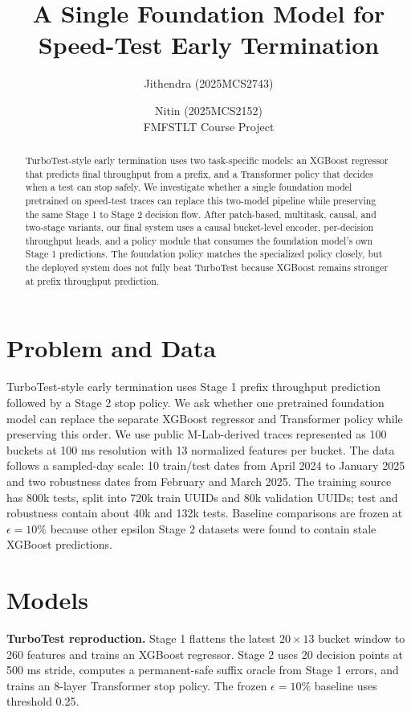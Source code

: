 \documentclass[10pt,twocolumn]{article}
\title{A Single Foundation Model for Speed-Test Early Termination}
\author{Jithendra (2025MCS2743) \and Nitin (2025MCS2152)\\
FMFSTLT Course Project}
\date{}
\newcommand{\eps}{\epsilon}
\begin{document}
\maketitle

\begin{abstract}
TurboTest-style early termination uses two task-specific models: an XGBoost regressor that predicts final throughput from a prefix, and a Transformer policy that decides when a test can stop safely. We investigate whether a single foundation model pretrained on speed-test traces can replace this two-model pipeline while preserving the same Stage 1 to Stage 2 decision flow. After patch-based, multitask, causal, and two-stage variants, our final system uses a causal bucket-level encoder, per-decision throughput heads, and a policy module that consumes the foundation model's own Stage 1 predictions. The foundation policy matches the specialized policy closely, but the deployed system does not fully beat TurboTest because XGBoost remains stronger at prefix throughput prediction.
\end{abstract}

\section{Problem and Data}
TurboTest-style early termination uses Stage 1 prefix throughput prediction followed by a Stage 2 stop policy. We ask whether one pretrained foundation model can replace the separate XGBoost regressor and Transformer policy while preserving this order. We use public M-Lab-derived traces represented as 100 buckets at 100 ms resolution with 13 normalized features per bucket. The data follows a sampled-day scale: 10 train/test dates from April 2024 to January 2025 and two robustness dates from February and March 2025. The training source has 800k tests, split into 720k train UUIDs and 80k validation UUIDs; test and robustness contain about 40k and 132k tests. Baseline comparisons are frozen at $\eps=10\%$ because other epsilon Stage 2 datasets were found to contain stale XGBoost predictions.

\section{Models}
\textbf{TurboTest reproduction.} Stage 1 flattens the latest $20\times13$ bucket window to 260 features and trains an XGBoost regressor. Stage 2 uses 20 decision points at 500 ms stride, computes a permanent-safe suffix oracle from Stage 1 errors, and trains an 8-layer Transformer stop policy. The frozen $\eps=10\%$ baseline uses threshold 0.25.
\end{document}
